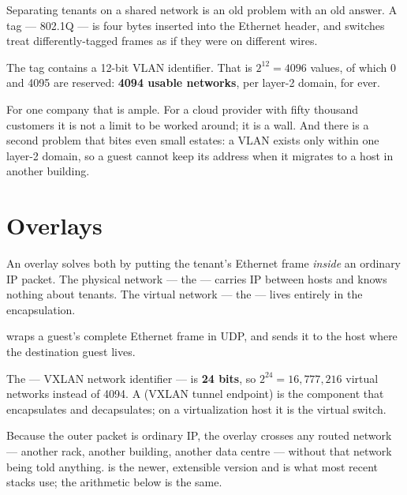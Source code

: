 Separating tenants on a shared network is an old problem with an old answer. A
 tag --- 802.1Q --- is four bytes inserted into the Ethernet header,
and switches treat differently-tagged frames as if they were on different
wires.

The tag contains a 12-bit VLAN identifier. That is $2^{12} = 4096$ values, of
which 0 and 4095 are reserved: \textbf{4094 usable networks}, per layer-2
domain, for ever.

For one company that is ample. For a cloud provider with fifty thousand
customers it is not a limit to be worked around; it is a wall. And there is a
second problem that bites even small estates: a VLAN exists only within one
layer-2 domain, so a guest cannot keep its address when it migrates to a host
in another building.

\section{Overlays}

An overlay solves both by putting the tenant's Ethernet frame \emph{inside} an
ordinary IP packet. The physical network --- the  --- carries
IP between hosts and knows nothing about tenants. The virtual network --- the
 --- lives entirely in the encapsulation.

\begin{definitionbox}
 wraps a guest's complete Ethernet frame in UDP, and sends it to
the host where the destination guest lives.

\smallskip
The  --- VXLAN network identifier --- is \textbf{24 bits}, so
$2^{24} = 16{,}777{,}216$ virtual networks instead of 4094. A 
(VXLAN tunnel endpoint) is the component that encapsulates and decapsulates;
on a virtualization host it is the virtual switch.

\smallskip
Because the outer packet is ordinary IP, the overlay crosses any routed network
--- another rack, another building, another data centre --- without that
network being told anything.  is the newer, extensible version and
is what most recent stacks use; the arithmetic below is the same.
\end{definitionbox}

